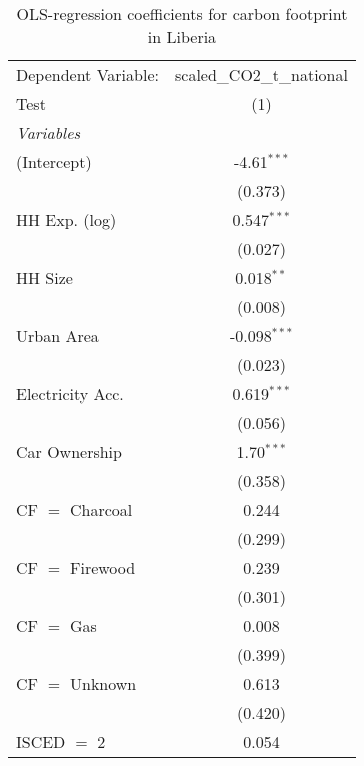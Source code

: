 
\begin{table}[htbp!]
   \centering
   \small
   \begin{adjustbox}{width = 1\textwidth, max height = 0.95\textheight, center}
      \begin{threeparttable}[b]
         \caption{\label{tab:OLS_2_LBR} OLS-regression coefficients for carbon footprint in Liberia}
         \begin{tabular}{lc}
            \tabularnewline \midrule \midrule
            Dependent Variable: & scaled\_CO2\_t\_national\\     
            Test                & (1)\\  
            \midrule
            \emph{Variables}\\
            (Intercept)         & -4.61$^{***}$\\   
                                & (0.373)\\   
            HH Exp. (log)       & 0.547$^{***}$\\   
                                & (0.027)\\   
            HH Size             & 0.018$^{**}$\\   
                                & (0.008)\\   
            Urban Area          & -0.098$^{***}$\\   
                                & (0.023)\\   
            Electricity Acc.    & 0.619$^{***}$\\   
                                & (0.056)\\   
            Car Ownership       & 1.70$^{***}$\\   
                                & (0.358)\\   
            CF $=$ Charcoal     & 0.244\\   
                                & (0.299)\\   
            CF $=$ Firewood     & 0.239\\   
                                & (0.301)\\   
            CF $=$ Gas          & 0.008\\   
                                & (0.399)\\   
            CF $=$ Unknown      & 0.613\\   
                                & (0.420)\\   
            ISCED $=$ 2         & 0.054\\   

\end{tabular}
\end{threeparttable}
\end{adjustbox}
\end{table}
